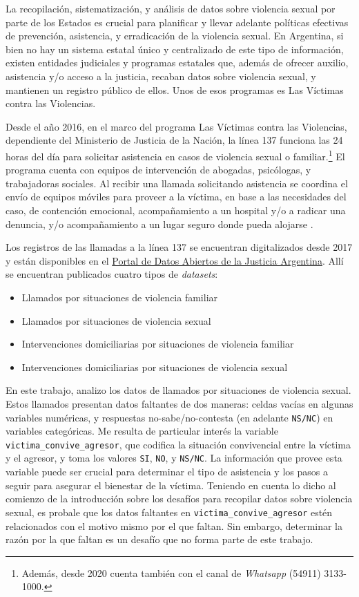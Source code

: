\documentclass[10 pt]{article}
\begin{document}
La  recopilación, sistematización, y análisis de datos sobre violencia sexual por parte de los Estados es crucial para planificar y llevar adelante políticas efectivas de prevención, asistencia, y erradicación de la violencia sexual. En Argentina, si bien no hay un sistema estatal único y centralizado de este tipo de información, existen entidades judiciales y programas estatales que, además de ofrecer auxilio, asistencia y/o acceso a la justicia, recaban datos sobre violencia sexual, y mantienen un registro público de ellos. Unos de esos programas es Las Víctimas contra las Violencias. 

Desde el año 2016, en el marco del programa Las Víctimas contra las Violencias, dependiente del Ministerio de Justicia de la Nación, la línea 137 funciona las 24 horas del día para solicitar asistencia en casos de violencia sexual o familiar.\footnote{Además, desde 2020 cuenta también con el canal de \textit{Whatsapp} (54911) 3133-1000.} El programa cuenta con equipos de intervención de abogadas, psicólogas, y trabajadoras sociales. Al recibir una llamada solicitando asistencia se coordina el envío de equipos móviles para proveer a la víctima, en base a las necesidades del caso, de contención emocional, acompañamiento a un hospital y/o a radicar una denuncia, y/o acompañamiento a un lugar seguro donde pueda alojarse \citep*{linea_137}.

Los registros de las llamadas a la línea 137 se encuentran digitalizados desde 2017 y están disponibles en el \href{http://datos.jus.gob.ar/}{Portal de Datos Abiertos de la Justicia Argentina}. Allí se encuentran publicados cuatro tipos de \textit{datasets}: 

\begin{itemize}
    \item Llamados por situaciones de violencia familiar
    \item Llamados por situaciones de violencia sexual
    \item Intervenciones domiciliarias por situaciones de violencia familiar
    \item Intervenciones domiciliarias por situaciones de violencia sexual
\end{itemize}

En este trabajo, analizo los datos de llamados por situaciones de violencia sexual. Estos llamados presentan datos faltantes de dos maneras: celdas vacías en algunas variables numéricas, y respuestas no-sabe/no-contesta (en adelante \texttt{NS/NC}) en variables categóricas. Me resulta de particular interés la variable \texttt{victima\_convive\_agresor}, que codifica la situación convivencial entre la víctima y el agresor, y toma los valores \texttt{SI}, \texttt{NO}, y \texttt{NS/NC}. La información que provee esta variable puede ser crucial para determinar el tipo de asistencia y los pasos a seguir para asegurar el bienestar de la víctima. Teniendo en cuenta lo dicho al comienzo de la introducción sobre los desafíos para recopilar datos sobre violencia sexual, es probale que los datos faltantes en \texttt{victima\_convive\_agresor} estén relacionados con el motivo mismo por el que faltan. Sin embargo, determinar la razón por la que faltan es un desafío que no forma parte de este trabajo. 
\end{document}
